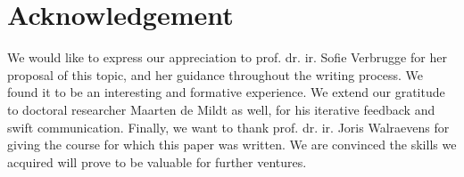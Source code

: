 \section*{Acknowledgement}

We would like to express our appreciation to prof. dr. ir. Sofie Verbrugge for her proposal of this topic, and her guidance throughout the writing process.
We found it to be an interesting and formative experience.
We extend our gratitude to doctoral researcher Maarten de Mildt as well, 
for his iterative feedback and swift communication.
Finally, we want to thank prof. dr. ir. Joris Walraevens for giving the course for which this paper was written.
We are convinced the skills we acquired will prove to be valuable for further ventures.